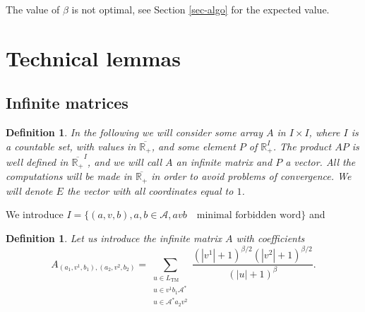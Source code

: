 \documentclass[11 pt]{article}
\newtheorem{definition}[proposition]{Definition}
\theoremstyle{definition}
\begin{document}
The value of $\beta$ is not optimal, see Section \ref{sec-algo} for the expected value.


\section{Technical lemmas}
\subsection{Infinite matrices}




\begin{definition}
In the following we will consider some array $A$ in $I\times I$, where $I$ is a countable set,  with values in $\overline{\mathbb R_+}$, and some element $P$ of $\mathbb R_+^{I}$. The product $AP$ is well defined in $\overline{\mathbb R_+}^{I}$, and we will call $A$ an infinite matrix and $P$ a vector. All the computations will be made in $\overline{\mathbb R_+}$ in order to avoid problems of convergence. We will denote $E$ the vector with all coordinates equal to $1$.
\end{definition}

We introduce
$I=\{(a,v,b),a,b\in\mathcal A, avb\quad \text{minimal forbidden word}\}$ and

\begin{definition}
Let us introduce the infinite matrix $A$ with coefficients
$$A_{(a_1,v^1,b_1), (a_2,v^2,b_2)}=\sum_{\substack{u\in L_{\mathrm{TM}}\\ u\in v^1b_1\mathcal{A}^*\\ u\in \mathcal{A}^*a_2v^2}} \frac{(|v^1|+1)^{\beta/2}(|v^2|+1)^{\beta/2}}{(|u|+1)^\beta}.$$
\end{definition}
\end{document}

